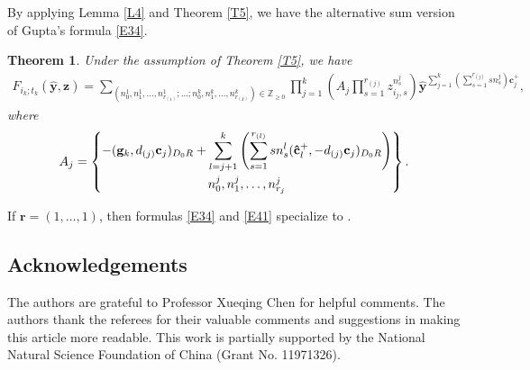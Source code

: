 \documentclass[pdftex]{sigma}
\numberwithin{equation}{section}
\newtheorem{Theorem}{Theorem}[section]
\begin{document}
By applying Lemma \ref{L4} and Theorem \ref{T5}, we have the alternative sum version of Gupta's formula \eqref{E34}.
\begin{Theorem}\label{T6}
 Under the assumption of Theorem {\rm\ref{T5}}, we have
 \begin{align}
 F_{i_k;t_k}(\hat{\mathbf{y}},\mathbf{z})=\sum_{(n_0^1,n_{1}^{1},\dots,n_{r_{(1)}}^1;\dots;n_0^{k},n_{1}^{k},\dots,n_{r_{(k)}}^k)\in\mathbb{Z}_{\ge0}}
 \prod\limits_{j=1}^{k}\left(A_j\prod\limits_{s=1}^{r_{(j)}}z_{i_j,s}^{n_s^j}\right)\hat{\mathbf{y}}^{\sum_{j=1}^{k}(\sum_{s=1}^{r_{(j)}}sn_s^j)\mathbf{c}_{j}^+},\label{E41}
 \end{align}
 where
 \begin{align*}
 A_j=\begin{Bmatrix}\displaystyle -(\mathbf{g}_{k},d_{(j)}\mathbf{c}_{j})_{D_0R}+\sum\limits_{l=j+1}^{k}
 \left(\sum\limits_{s=1}^{r_{(l)}}sn_{s}^{l}(\mathbf{\hat{c}}_{l}^+,-d_{(j)}\mathbf{c}_{j})_{D_0R}\right)\vspace{1mm}\\ n_0^j,n_{1}^j,\dots,n_{r_{j}}^j\end{Bmatrix}.
 \end{align*}
\end{Theorem}
\begin{Remark}
 If $\mathbf{r}=(1,\dots, 1)$, then formulas \eqref{E34} and \eqref{E41} specialize to \cite[Theorems 3.1 and~6.2]{LMN2023}.
\end{Remark}

\subsection*{Acknowledgements}

The authors are grateful to Professor Xueqing Chen for helpful comments. The authors thank the referees for their valuable comments and suggestions in making this article more readable. This work is partially supported by the National Natural Science Foundation of China (Grant No. 11971326).
\end{document}
